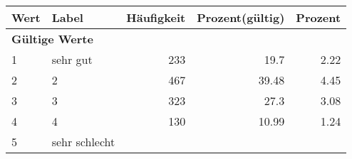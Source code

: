      \begin{longtable}{lXrrr}
     \toprule
     \textbf{Wert} & \textbf{Label} & \textbf{Häufigkeit} & \textbf{Prozent(gültig)} & \textbf{Prozent} \\
     \endhead
     \midrule
     \multicolumn{5}{l}{\textbf{Gültige Werte}}\\

     1 &
     \multicolumn{1}{X}{ sehr gut   } &


       \num{233} &
       \num[round-mode=places,round-precision=2]{19.7} &
         \num[round-mode=places,round-precision=2]{2.22} \\

     2 &
     \multicolumn{1}{X}{ 2   } &


       \num{467} &
       \num[round-mode=places,round-precision=2]{39.48} &
         \num[round-mode=places,round-precision=2]{4.45} \\

     3 &
     \multicolumn{1}{X}{ 3   } &


       \num{323} &
       \num[round-mode=places,round-precision=2]{27.3} &
         \num[round-mode=places,round-precision=2]{3.08} \\

     4 &
     \multicolumn{1}{X}{ 4   } &


       \num{130} &
       \num[round-mode=places,round-precision=2]{10.99} &
         \num[round-mode=places,round-precision=2]{1.24} \\

     5 &
     \multicolumn{1}{X}{ sehr schlecht   } &



\end{longtable}
